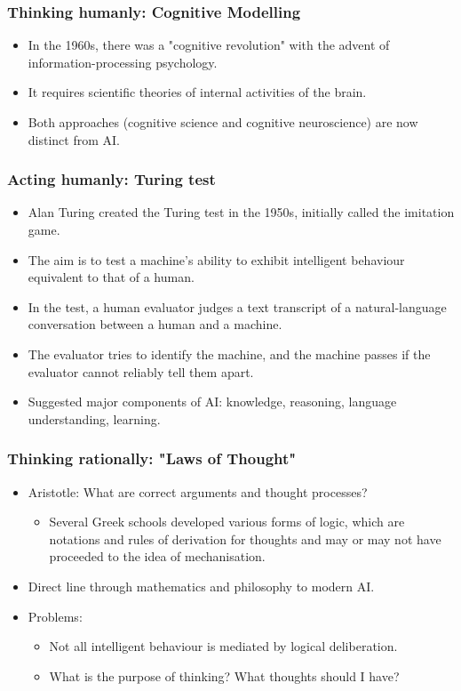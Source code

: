 \documentclass[11pt]{article}
\begin{document}
\subsubsection{Thinking humanly: Cognitive Modelling}
\label{sec:org814d4f6}
\begin{itemize}
\item In the 1960s, there was a "cognitive revolution" with the advent of information-processing psychology.
\item It requires scientific theories of internal activities of the brain.
\item Both approaches (cognitive science and cognitive neuroscience) are now distinct from AI.
\end{itemize}
\subsubsection{Acting humanly: Turing test}
\label{sec:org49f6844}
\begin{itemize}
\item Alan Turing created the Turing test in the 1950s, initially called the imitation game.
\item The aim is to test a machine's ability to exhibit intelligent behaviour equivalent to that of a human.
\item In the test, a human evaluator judges a text transcript of a natural-language conversation between a human and a machine.
\item The evaluator tries to identify the machine, and the machine passes if the evaluator cannot reliably tell them apart.
\item Suggested major components of AI: knowledge, reasoning, language understanding, learning.
\end{itemize}

 \newpage
\subsubsection{Thinking rationally: "Laws of Thought"}
\label{sec:org1df0daf}
\begin{itemize}
\item Aristotle: What are correct arguments and thought processes?
\begin{itemize}
\item Several Greek schools developed various forms of logic, which are notations and rules of derivation for thoughts and may or may not have proceeded to the idea of mechanisation.
\end{itemize}
\item Direct line through mathematics and philosophy to modern AI.
\item Problems:
\begin{itemize}
\item Not all intelligent behaviour is mediated by logical deliberation.
\item What is the purpose of thinking? What thoughts should I have?
\end{itemize}
\end{itemize}
\end{document}
